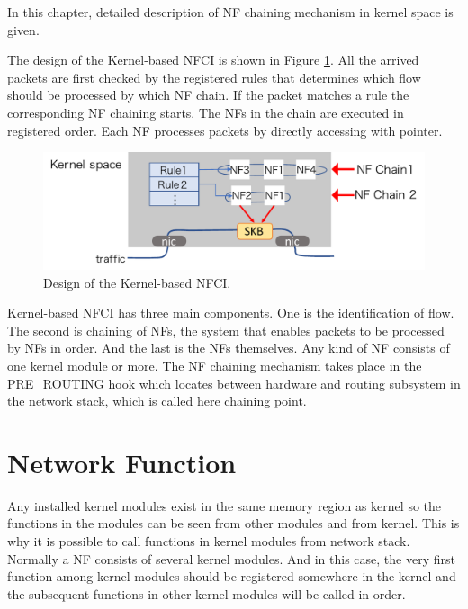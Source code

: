 In this chapter, detailed description of NF chaining mechanism in kernel space is given. 

The design of the Kernel-based NFCI is shown in Figure \ref{fig: design}. All the arrived packets are first checked by the registered rules that determines which flow should be processed by which NF chain. If the packet matches a rule the corresponding NF chaining starts. The NFs in the chain are executed in registered order. Each NF processes packets by directly accessing with pointer. 
 
 \begin{figure}
	\centering
	\includegraphics[width=120mm]{pics/design.pdf}
	\caption{Design of the Kernel-based NFCI.}
	\label{fig: design}
\end{figure}

Kernel-based NFCI has three main components. One is the identification of flow. The second is chaining of NFs, the system that enables packets to be processed by NFs in order. And the last is the NFs themselves. Any kind of NF consists of one kernel module or more. The NF chaining mechanism takes place in the PRE\_ROUTING hook which locates between hardware and routing subsystem in the network stack, which is called here chaining point. 

\section{Network Function}
Any installed kernel modules exist in the same memory region as kernel so the functions in the modules can be seen from other modules and from kernel. This is why it is possible to call functions in kernel modules from network stack. Normally a NF consists of several kernel modules. And in this case, the very first function among kernel modules should be registered somewhere in the kernel and the subsequent functions in other kernel modules will be called in order. 

